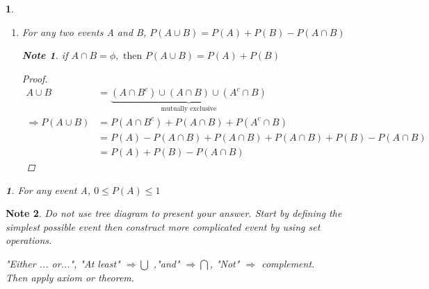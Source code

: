 \documentclass[11pt]{article}
\newtheorem{theorem}{\framebox{Thm}}[section]
\newtheorem{corollary}{\framebox{Cor}}[theorem]
\newtheorem*{note}{Note}
\newcommand\tab[1][1cm]{\hspace*{#1}}
\begin{document}
\begin{theorem}
\begin{enumerate}
\begin{proof}
                        \end{proof}
                    \item For any two events A and B, $P(A\cup B) = P(A) +P(B) -P(A\cap B)$
                        \begin{note}
                            if $A\cap B = \phi, \text{ then } P(A\cup B )= P(A) + P(B)$
                        \end{note}
                        \begin{proof}
                            \begin{align*}
                                A \cup B &= \underbrace{(A \cap B^c) \cup (A\cap B) \cup (A^c \cap B)}_{\text{mutually exclusive}}\\
                                \Rightarrow P(A\cup B)  &= P(A\cap B^c) + P(A\cap B ) + P(A^c \cap B) \tag{Ax 3}\\
                                                        &= P(A) - P(A\cap B) +P(A\cap B) + P(A \cap B) +P(B) -P(A\cap B) \tag{Thm 3}\\
                                                        &=P(A)+P(B) -P(A\cap B)
                            \end{align*}
                        \end{proof}
                \end{enumerate}
                \begin{corollary}
                    For any event A, $0 \leq P(A) \leq 1$
                \end{corollary}
            \end{theorem}

            \begin{note}
                Do not use tree diagram to present your answer. Start by defining the simplest possible event then 
                construct more complicated event by using set operations.
                
                "Either ... or...", "At least" $\Rightarrow \bigcup$ ,\tab "and" $\Rightarrow \bigcap$,
                \tab "Not" $\Rightarrow $ complement.
                \\Then apply axiom or theorem.
            \end{note}
            
\end{document}
